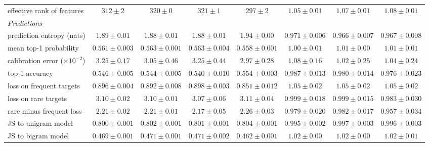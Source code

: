 \begin{center}
\begin{minipage}{\linewidth}
{\begin{tabular}{@{}l|cccc|ccc@{}}
effective rank of features & $312 \pm 2$ & $320 \pm 0$ & $321 \pm 1$ & $297 \pm 2$ & $1.05 \pm 0.01$ & $1.07 \pm 0.01$ & $1.08 \pm 0.01$ \\
\emph{Predictions} & & & & & & & \\
prediction entropy (nats) & $1.89 \pm 0.01$ & $1.88 \pm 0.01$ & $1.88 \pm 0.01$ & $1.94 \pm 0.00$ & $0.971 \pm 0.006$ & $0.966 \pm 0.007$ & $0.967 \pm 0.008$ \\
mean top-1 probability & $0.561 \pm 0.003$ & $0.563 \pm 0.001$ & $0.563 \pm 0.004$ & $0.558 \pm 0.001$ & $1.00 \pm 0.01$ & $1.01 \pm 0.00$ & $1.01 \pm 0.01$ \\
calibration error ($\times10^{-2}$) & $3.25 \pm 0.17$ & $3.05 \pm 0.46$ & $3.25 \pm 0.44$ & $2.97 \pm 0.28$ & $1.08 \pm 0.16$ & $1.02 \pm 0.25$ & $1.04 \pm 0.24$ \\
top-1 accuracy & $0.546 \pm 0.005$ & $0.544 \pm 0.005$ & $0.540 \pm 0.010$ & $0.554 \pm 0.003$ & $0.987 \pm 0.013$ & $0.980 \pm 0.014$ & $0.976 \pm 0.023$ \\
loss on frequent targets & $0.896 \pm 0.004$ & $0.892 \pm 0.008$ & $0.898 \pm 0.003$ & $0.851 \pm 0.012$ & $1.05 \pm 0.02$ & $1.05 \pm 0.02$ & $1.05 \pm 0.02$ \\
loss on rare targets & $3.10 \pm 0.02$ & $3.10 \pm 0.01$ & $3.07 \pm 0.06$ & $3.11 \pm 0.04$ & $0.999 \pm 0.018$ & $0.999 \pm 0.015$ & $0.983 \pm 0.030$ \\
rare minus frequent loss & $2.21 \pm 0.02$ & $2.21 \pm 0.01$ & $2.17 \pm 0.05$ & $2.26 \pm 0.03$ & $0.979 \pm 0.020$ & $0.982 \pm 0.017$ & $0.957 \pm 0.034$ \\
JS to unigram model & $0.800 \pm 0.001$ & $0.802 \pm 0.001$ & $0.801 \pm 0.001$ & $0.804 \pm 0.001$ & $0.995 \pm 0.002$ & $0.997 \pm 0.003$ & $0.996 \pm 0.003$ \\
JS to bigram model & $0.469 \pm 0.001$ & $0.471 \pm 0.001$ & $0.471 \pm 0.002$ & $0.462 \pm 0.001$ & $1.02 \pm 0.00$ & $1.02 \pm 0.00$ & $1.02 \pm 0.01$ \\
\end{tabular}}\end{minipage}
\end{center}

